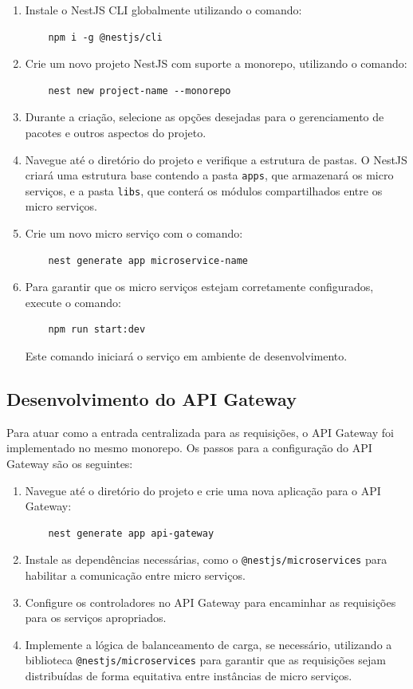 \begin{enumerate}
    \item Instale o NestJS CLI globalmente utilizando o comando:
    \begin{verbatim}
    npm i -g @nestjs/cli
    \end{verbatim}
    \item Crie um novo projeto NestJS com suporte a monorepo, utilizando o comando:
    \begin{verbatim}
    nest new project-name --monorepo
    \end{verbatim}
    \item Durante a criação, selecione as opções desejadas para o gerenciamento de pacotes e outros aspectos do projeto.
    \item Navegue até o diretório do projeto e verifique a estrutura de pastas. O NestJS criará uma estrutura base contendo a pasta \texttt{apps}, que armazenará os micro serviços, e a pasta \texttt{libs}, que conterá os módulos compartilhados entre os micro serviços.
    \item Crie um novo micro serviço com o comando:
    \begin{verbatim}
    nest generate app microservice-name
    \end{verbatim}
    \item Para garantir que os micro serviços estejam corretamente configurados, execute o comando:
    \begin{verbatim}
    npm run start:dev
    \end{verbatim}
    Este comando iniciará o serviço em ambiente de desenvolvimento.
\end{enumerate}

\subsection{Desenvolvimento do API Gateway}
Para atuar como a entrada centralizada para as requisições, o API Gateway foi implementado no mesmo monorepo. Os passos para a configuração do API Gateway são os seguintes:

\begin{enumerate}
    \item Navegue até o diretório do projeto e crie uma nova aplicação para o API Gateway:
    \begin{verbatim}
    nest generate app api-gateway
    \end{verbatim}
    \item Instale as dependências necessárias, como o \texttt{@nestjs/microservices} para habilitar a comunicação entre micro serviços.
    \item Configure os controladores no API Gateway para encaminhar as requisições para os serviços apropriados.
    \item Implemente a lógica de balanceamento de carga, se necessário, utilizando a biblioteca \texttt{@nestjs/microservices} para garantir que as requisições sejam distribuídas de forma equitativa entre instâncias de micro serviços.
\end{enumerate}

